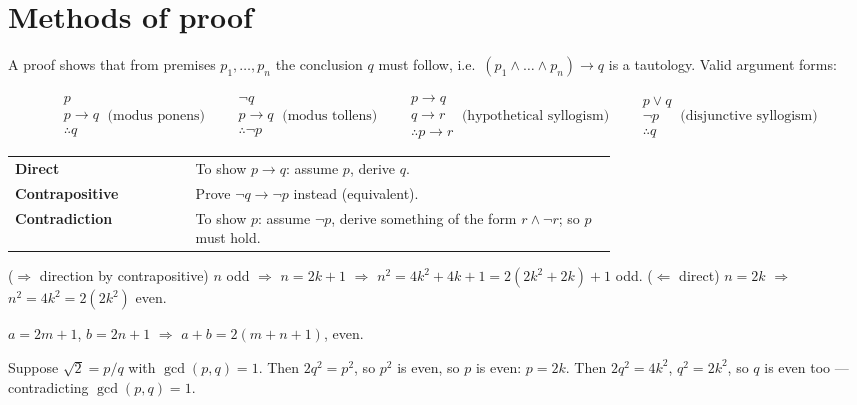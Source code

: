 \documentclass{fkt-notes}
\newcommand{\src}[1]{\par\noindent{\small\itshape Source: #1}\par\smallskip}
\theoremstyle{definition}
\begin{document}
\section{Methods of proof}\src{Kolman 2.3}\label{qg:proof}
%

A proof shows that from premises $p_1,\dots,p_n$ the conclusion $q$ must
follow, i.e.\ $(p_1\wedge\dots\wedge p_n)\to q$ is a tautology. Valid
argument forms:
\begin{rulepar}
  \[
    \begin{array}{c} p\\ p\to q\\\hline \therefore q\end{array}
    \ \text{(modus ponens)}\qquad
    \begin{array}{c} \neg q\\ p\to q\\\hline \therefore \neg p\end{array}
    \ \text{(modus tollens)}\qquad
    \begin{array}{c} p\to q\\ q\to r\\\hline \therefore p\to r\end{array}
    \ \text{(hypothetical syllogism)}\qquad
    \begin{array}{c} p\vee q\\ \neg p\\\hline \therefore q\end{array}
    \ \text{(disjunctive syllogism)}
  \]
\end{rulepar}

\begin{keybox}[title=Three proof methods]
  \begin{tabular}{@{}lp{0.7\linewidth}@{}}
    \textbf{Direct}         & To show $p\to q$: assume $p$, derive $q$.      \\
    \textbf{Contrapositive} & Prove $\neg q\to\neg p$ instead (equivalent).  \\
    \textbf{Contradiction}  & To show $p$: assume $\neg p$, derive something
    of the form $r\wedge\neg r$; so $p$ must hold.
  \end{tabular}
\end{keybox}

\begin{example}
  ($\Rightarrow$ direction by contrapositive) $n$ odd $\Rightarrow$ $n=2k+1$
  $\Rightarrow$ $n^2=4k^2+4k+1=2(2k^2+2k)+1$ odd.
  ($\Leftarrow$ direct) $n=2k$ $\Rightarrow$ $n^2=4k^2=2(2k^2)$ even.
\end{example}
\begin{example}[direct: odd $+$ odd $=$ even]
  $a=2m+1$, $b=2n+1$ $\Rightarrow$ $a+b=2(m+n+1)$, even.
\end{example}
\begin{example}
  Suppose $\sqrt2=p/q$ with $\gcd(p,q)=1$. Then $2q^2=p^2$, so $p^2$ is
  even, so $p$ is even: $p=2k$. Then $2q^2=4k^2$, $q^2=2k^2$, so $q$ is
  even too --- contradicting $\gcd(p,q)=1$.
\end{example}
\end{document}
